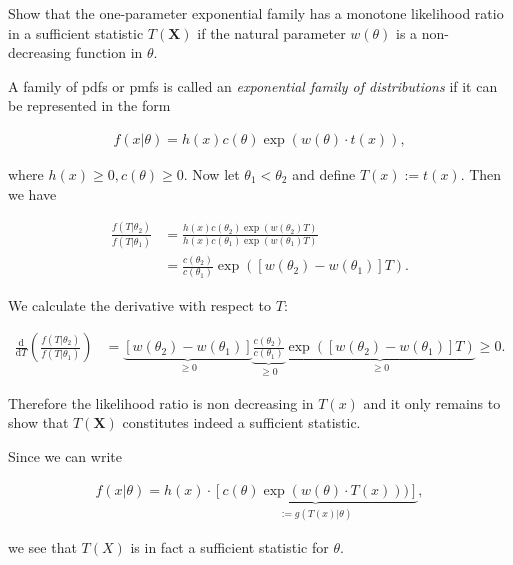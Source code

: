 
\begin{exercise}

Show that the one-parameter exponential family has a monotone likelihood
ratio in a sufficient statistic $T(\textbf{X})$ if the natural parameter
$w(\theta)$ is a non-decreasing function in $\theta$.

\end{exercise}


\begin{solution}

A family of pdfs or pmfs is called an \textit{exponential family of distributions}
if it can be represented in the form

\begin{align*}
    f(x | \theta) = h(x)c(\theta)\exp\left(w(\theta) \cdot t(x)\right),
\end{align*}

where $h(x) \geq 0, c(\theta) \geq 0$.
Now let $\theta_1 < \theta_2$ and define $T(x) := t(x)$. Then we have

\begin{align*}
    \frac{f(T | \theta_2)}{f(T | \theta_1)}
    &= \frac{h(x)c(\theta_2)\exp\left(w(\theta_2)T\right)}{h(x)c(\theta_1)\exp\left(w(\theta_1)T\right)} \\
    &= \frac{c(\theta_2)}{c(\theta_1)}\exp\left([w(\theta_2) - w(\theta_1)]T\right).
\end{align*}

We calculate the derivative with respect to $T$:

\begin{align*}
    \frac{\mathrm{d}}{\mathrm{d} T}\left(\frac{f(T | \theta_2)}{f(T | \theta_1)}\right)
    &= \underbrace{[w(\theta_2) - w(\theta_1)]}_{\geq 0}
    \underbrace{\frac{c(\theta_2)}{c(\theta_1)}}_{\geq 0}
    \underbrace{\exp\left([w(\theta_2) - w(\theta_1)]T\right)}_{\geq 0} \geq 0.
\end{align*}

Therefore the likelihood ratio is non decreasing in $T(x)$ and it only remains to show that
$T(\textbf{X})$ constitutes indeed a sufficient statistic.

Since we can write

\begin{align*}
    f(x | \theta) = h(x) \cdot \underbrace{[c(\theta) \exp(w(\theta) \cdot T(x)))]}_{:= g(T(x) | \theta)},
\end{align*}

we see that $T(X)$ is in fact a sufficient statistic for $\theta$.

\end{solution}

